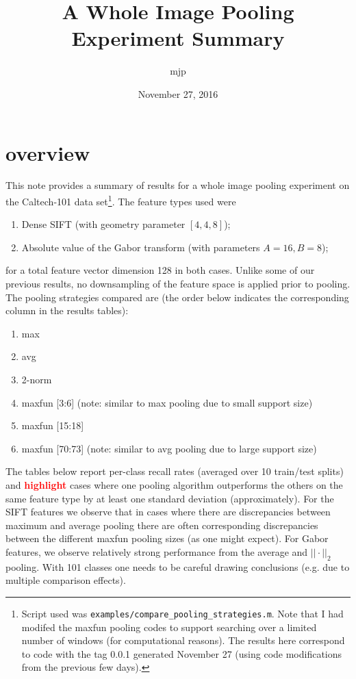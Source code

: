 \documentclass[10pt]{article}
\title{A Whole Image Pooling Experiment Summary}
\author{mjp}
\date{November 27, 2016}
\newcommand{\hl}[1]{\textbf{\textcolor{red}{#1}}}
\begin{document}
\maketitle

\section*{overview}
This note provides a summary of results for a whole image pooling experiment on the Caltech-101 data set\footnote{
Script used was \texttt{examples/compare\_pooling\_strategies.m}.  Note that I had modifed the maxfun pooling codes to support searching over a limited number of windows (for computational reasons).  The results here correspond to code with the tag 0.0.1 generated November 27 (using code modifications from the previous few days).}.  The feature types used were
\begin{enumerate}
\item Dense SIFT (with geometry parameter $[4, 4, 8]$);
\item Absolute value of the Gabor transform (with parameters $A=16, B=8$);
\end{enumerate}
%
for a total feature vector dimension 128 in both cases.
Unlike some of our previous results, no downsampling of the feature space is applied prior to pooling.
The pooling strategies compared are (the order below indicates the corresponding column in the results tables):
%
\begin{enumerate}
\item max
\item avg
\item 2-norm
\item maxfun [3:6]       (note: similar to max pooling due to small support size)
\item maxfun [15:18]
\item maxfun [70:73]  (note: similar to avg pooling due to large support size)
\end{enumerate}


The tables below report per-class recall rates (averaged over 10 train/test splits) and \hl{highlight} cases where one pooling algorithm outperforms the others on the same feature type by at least one standard deviation (approximately).
For the SIFT features we observe that in cases where there are discrepancies between maximum and average pooling there are often corresponding discrepancies between the different maxfun pooling sizes (as one might expect).
For Gabor features, we observe relatively strong performance from the average and $||\cdot||_2$ pooling.
With 101 classes one needs to be careful drawing conclusions (e.g. due to multiple comparison effects).
\end{document}
